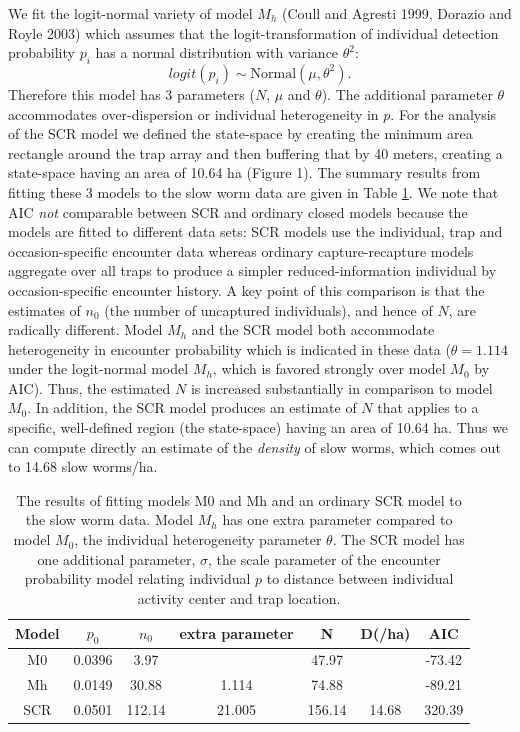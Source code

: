 \documentclass{book}
\begin{document}
We fit the logit-normal variety of model $M_h$ (Coull and Agresti
1999, Dorazio and Royle 2003) which assumes that the
logit-transformation of individual detection probability $p_i$ has a
normal distribution with variance $\theta^2$:
\[
 logit(p_i) \sim \mbox{Normal}(\mu, \theta^2).
\]
Therefore this model has 3 parameters ($N$, $\mu$ and $\theta$).  The
additional parameter $\theta$ accommodates over-dispersion or
individual heterogeneity in $p$.
For the analysis of the SCR model we defined
 the state-space by creating the minimum area rectangle around the trap array
and then buffering that by 40 meters, creating a state-space having an
area of 10.64 ha (Figure 1).
The summary results from fitting these 3 models to the slow worm data
are given in Table \ref{tab.results}. We note that
AIC {\it not} comparable between SCR and ordinary closed models because the
models are fitted to different data sets:
SCR models use the individual, trap and occasion-specific
encounter data whereas ordinary capture-recapture models aggregate
over all traps to produce a simpler reduced-information individual by
occasion-specific encounter history.  A key point of this comparison
is that the estimates of $n_0$ (the number of uncaptured individuals),
and hence of $N$, are radically different. Model $M_h$ and the SCR
model both accommodate heterogeneity in encounter probability which is
indicated in these data ($\theta = 1.114$ under the logit-normal model
$M_h$, which is favored strongly over model $M_0$ by AIC). Thus, the estimated $N$ is increased substantially in
comparison to model $M_0$. In addition, the SCR model produces an
estimate of $N$ that applies to a specific, well-defined region (the
state-space) having an area of 10.64 ha. Thus we can compute directly
an estimate of the {\it density} of slow worms, which comes out to
14.68 slow worms/ha. 


\begin{table}[ht]
\centering
\caption{The results of fitting models M0 and Mh and an ordinary SCR
  model to the slow worm data. Model $M_h$ has one extra parameter
  compared to model $M_0$, the individual heterogeneity parameter
  $\theta$. The SCR model has one additional parameter, $\sigma$, the
  scale parameter of the encounter probability model relating
  individual $p$ to distance between individual activity center and
  trap location. }
\begin{tabular}{ccccccc}
Model & $p_0$ &  $n_0$   & extra parameter & N      & D(/ha)  & AIC     \\ \hline
M0    &  0.0396  & 3.97  &                & 47.97 &         & -73.42  \\
Mh    &  0.0149  & 30.88 & 1.114        & 74.88 &         & -89.21  \\
SCR   &  0.0501  & 112.14& 21.005        & 156.14 & 14.68   & 320.39  \\
\end{tabular}
\label{tab.results}
\end{table}
\end{document}
